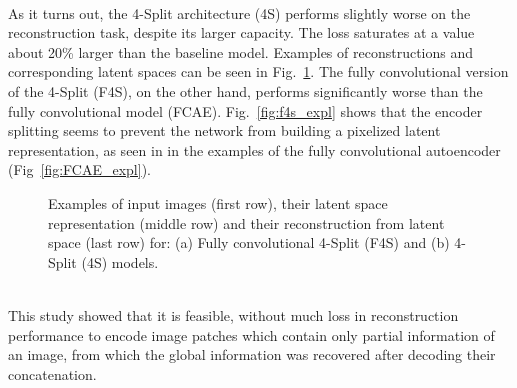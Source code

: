 \documentclass[../../main.tex]{subfiles}
\begin{document}
\\
As it turns out, the 4-Split architecture (4S) performs slightly worse on the reconstruction task, despite its larger capacity. The loss saturates at a value about 20\% larger than the baseline model. Examples of reconstructions and corresponding latent spaces can be seen in Fig.~\ref{fig:4split_2}. The fully convolutional version of the 4-Split (F4S), on the other hand, performs significantly worse than the fully convolutional model (FCAE). Fig.~\ref{fig:f4s_expl} shows that the encoder splitting seems to prevent the network from building a pixelized latent representation, as seen in in the examples of the fully convolutional autoencoder (Fig~\ref{fig:FCAE_expl}).\\
\begin{figure}[htp]
	\begin{center}
		\hspace{4mm}
		\caption{Examples of input images (first row), their latent space representation (middle row) and their reconstruction from latent space (last row) for: (a) Fully convolutional 4-Split (F4S) and (b) 4-Split (4S) models.}
		\label{fig:4split_2}
	\end{center}
\end{figure}
\\
This study showed that it is feasible, without much loss in reconstruction performance to encode image patches which contain only partial information of an image, from which the global information was recovered after decoding their concatenation.
\end{document}

